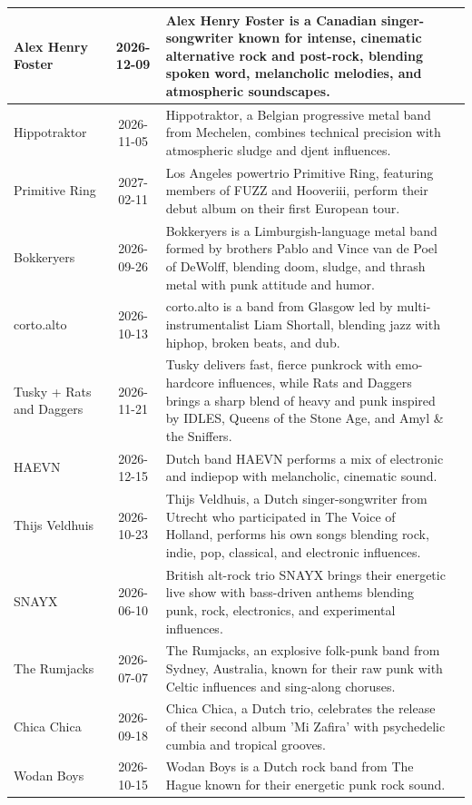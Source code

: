 \begin{center}
\begin{longtable}{p{3cm}cp{7cm}p{3cm}}
\midrule
Alex Henry Foster & 2026-12-09 & Alex Henry Foster is a Canadian singer-songwriter known for intense, cinematic alternative rock and post-rock, blending spoken word, melancholic melodies, and atmospheric soundscapes. \\
\midrule
Hippotraktor & 2026-11-05 & Hippotraktor, a Belgian progressive metal band from Mechelen, combines technical precision with atmospheric sludge and djent influences. \\
\midrule
Primitive Ring & 2027-02-11 & Los Angeles powertrio Primitive Ring, featuring members of FUZZ and Hooveriii, perform their debut album on their first European tour. \\
\midrule
Bokkeryers & 2026-09-26 & Bokkeryers is a Limburgish-language metal band formed by brothers Pablo and Vince van de Poel of DeWolff, blending doom, sludge, and thrash metal with punk attitude and humor. \\
\midrule
corto.alto & 2026-10-13 & corto.alto is a band from Glasgow led by multi-instrumentalist Liam Shortall, blending jazz with hiphop, broken beats, and dub. \\
\midrule
Tusky + Rats and Daggers & 2026-11-21 & Tusky delivers fast, fierce punkrock with emo-hardcore influences, while Rats and Daggers brings a sharp blend of heavy and punk inspired by IDLES, Queens of the Stone Age, and Amyl \& the Sniffers. \\
\midrule
HAEVN & 2026-12-15 & Dutch band HAEVN performs a mix of electronic and indiepop with melancholic, cinematic sound. \\
\midrule
Thijs Veldhuis & 2026-10-23 & Thijs Veldhuis, a Dutch singer-songwriter from Utrecht who participated in The Voice of Holland, performs his own songs blending rock, indie, pop, classical, and electronic influences. \\
\midrule
SNAYX & 2026-06-10 & British alt-rock trio SNAYX brings their energetic live show with bass-driven anthems blending punk, rock, electronics, and experimental influences. \\
\midrule
The Rumjacks & 2026-07-07 & The Rumjacks, an explosive folk-punk band from Sydney, Australia, known for their raw punk with Celtic influences and sing-along choruses. \\
\midrule
Chica Chica & 2026-09-18 & Chica Chica, a Dutch trio, celebrates the release of their second album 'Mi Zafira' with psychedelic cumbia and tropical grooves. \\
\midrule
Wodan Boys & 2026-10-15 & Wodan Boys is a Dutch rock band from The Hague known for their energetic punk rock sound. \\

\end{longtable}
\end{center}
